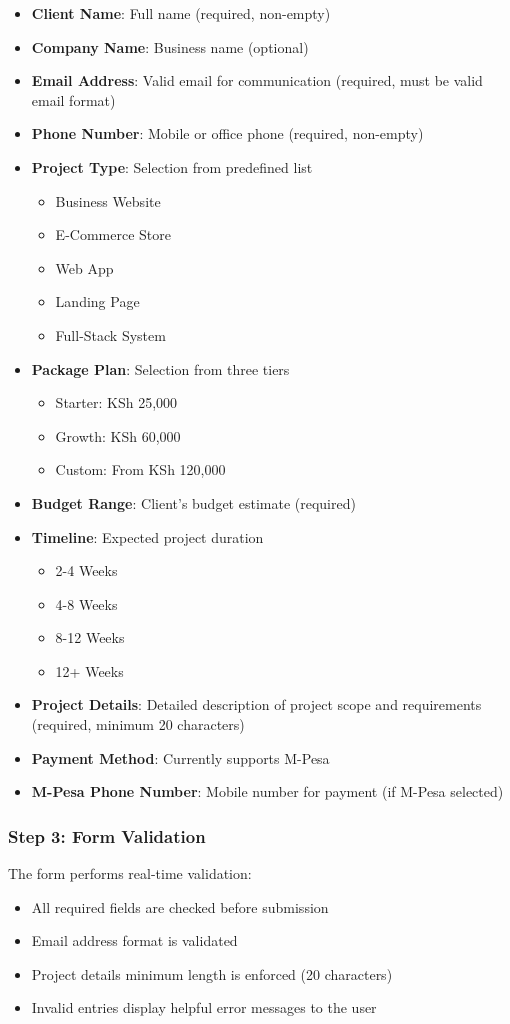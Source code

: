 \documentclass[12pt]{article}
\begin{document}
\begin{itemize}
  \item \textbf{Client Name}: Full name (required, non-empty)
  \item \textbf{Company Name}: Business name (optional)
  \item \textbf{Email Address}: Valid email for communication (required, must be valid email format)
  \item \textbf{Phone Number}: Mobile or office phone (required, non-empty)
  \item \textbf{Project Type}: Selection from predefined list
    \begin{itemize}
      \item Business Website
      \item E-Commerce Store
      \item Web App
      \item Landing Page
      \item Full-Stack System
    \end{itemize}
  \item \textbf{Package Plan}: Selection from three tiers
    \begin{itemize}
      \item Starter: KSh 25,000
      \item Growth: KSh 60,000
      \item Custom: From KSh 120,000
    \end{itemize}
  \item \textbf{Budget Range}: Client's budget estimate (required)
  \item \textbf{Timeline}: Expected project duration
    \begin{itemize}
      \item 2-4 Weeks
      \item 4-8 Weeks
      \item 8-12 Weeks
      \item 12+ Weeks
    \end{itemize}
  \item \textbf{Project Details}: Detailed description of project scope and requirements (required, minimum 20 characters)
  \item \textbf{Payment Method}: Currently supports M-Pesa
  \item \textbf{M-Pesa Phone Number}: Mobile number for payment (if M-Pesa selected)
\end{itemize}

\subsubsection{Step 3: Form Validation}
The form performs real-time validation:
\begin{itemize}
  \item All required fields are checked before submission
  \item Email address format is validated
  \item Project details minimum length is enforced (20 characters)
  \item Invalid entries display helpful error messages to the user
\end{itemize}
\end{document}
